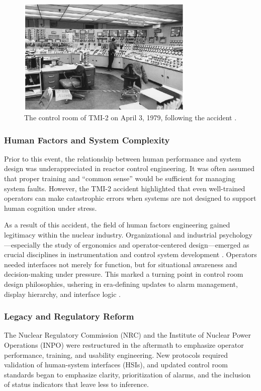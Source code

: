 \documentclass[12pt]{article}
\begin{document}
\begin{figure}[H]
  \centering
  \includegraphics[width=0.75\textwidth]{tmicontrolroom.png}
  \caption{The control room of TMI-2 on April 3, 1979, following the accident \autocite{tmiwalker}.}
  \label{fig:tmicontrolroom}
\end{figure}

\subsubsection{Human Factors and System Complexity}
Prior to this event, the relationship between human performance and system design was underappreciated in reactor control engineering. It was often assumed that proper training and “common sense” would be sufficient for managing system faults. However, the TMI-2 accident highlighted that even well-trained operators can make catastrophic errors when systems are not designed to support human cognition under stress.

As a result of this accident, the field of human factors engineering gained legitimacy within the nuclear industry. Organizational and industrial psychology—especially the study of ergonomics and operator-centered design—emerged as crucial disciplines in instrumentation and control system development \autocite{meshkati1991human}. Operators needed interfaces not merely for function, but for situational awareness and decision-making under pressure. This marked a turning point in control room design philosophies, ushering in era-defining updates to alarm management, display hierarchy, and interface logic \autocite{moderninstruments}.

\subsubsection{Legacy and Regulatory Reform}
The Nuclear Regulatory Commission (NRC) and the Institute of Nuclear Power Operations (INPO) were restructured in the aftermath to emphasize operator performance, training, and usability engineering. New protocols required validation of human-system interfaces (HSIs), and updated control room standards began to emphasize clarity, prioritization of alarms, and the inclusion of status indicators that leave less to inference.
\end{document}
